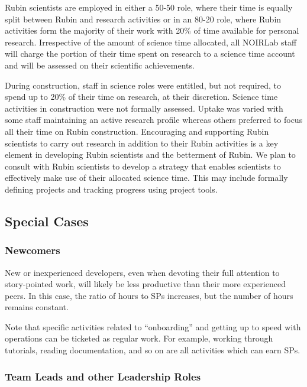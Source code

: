 Rubin scientists are employed in either a 50-50 role, where their time is equally split between Rubin and research activities or in an 80-20 role, where Rubin activities form the majority of their work  with 20\% of time available for personal research. 
Irrespective of the amount of science time allocated, all NOIRLab staff will charge the portion of their time spent on research to a science time account and will be assessed on their scientific achievements. 

During construction, staff in science roles were entitled, but not required, to spend up to 20\% of their time on research, at their discretion. 
Science time activities in construction were not formally assessed. 
Uptake was varied with some staff maintaining an active  research profile whereas others preferred to focus all their time on Rubin construction. 
Encouraging and supporting Rubin scientists to carry out research in addition to their Rubin activities is a key element in developing Rubin scientists and the betterment of Rubin. 
We plan to consult with Rubin scientists to develop a strategy  that enables scientists to effectively make use of their allocated science time.
This may include formally defining projects and tracking progress using project tools. 

\subsection{Special Cases}

\subsubsection{Newcomers}
\label{sec:newcomers}

New or inexperienced developers, even when devoting their full attention to \gls{story}-pointed work, will likely be less productive than their more experienced peers.
In this case, the ratio of hours to \glspl{SP} increases, but the number of hours remains constant.

Note that specific activities related to ``onboarding'' and getting up to speed with operations can be ticketed as regular work.
For example, working through tutorials, reading documentation, and so on are all activities which can earn \glspl{SP}.

\subsubsection{Team Leads and other Leadership Roles}

